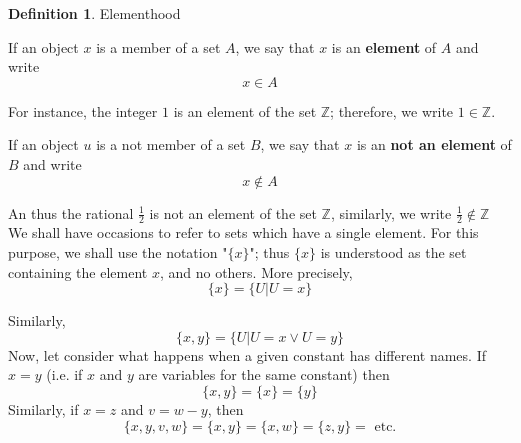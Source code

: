 \documentclass{book}
\theoremstyle{definition}
\newtheorem{definition}{Definition}[section]
\theoremstyle{remark}
\newcommand{\bb}[1]{\mathbb{#1}}
\begin{document}
\begin{definition}
Elementhood  \\

    \begin{tcolorbox}
        If an object $x$ is a member of a set $A$, we say that $x$ is an \textbf{element} of $A$ and write
            \begin{equation*}
                x \in A
            \end{equation*}
    \end{tcolorbox}
    
    For instance, the integer $1$ is an element of the set $\bb{Z}$; therefore, we write $1 \in \bb{Z}$. \\
    
    \begin{tcolorbox}
        If an object $u$ is a not member of a set $B$, we say that $x$ is an \textbf{not an element} of $B$ and write
            \begin{equation*}
                x \notin A
            \end{equation*}
    \end{tcolorbox}
    An thus the rational $\frac{1}{2}$ is not an element of the set $\bb{Z}$, similarly, we write $\frac{1}{2} \notin \bb{Z}$ \\
    
    We shall have occasions to refer to sets which have a single element. For this purpose, we shall use the notation "$\{ x \}$"; thus $\{ x \}$ is understood as the set containing the element $x$, and no others. More precisely, 
        \begin{equation*}
            \{ x \} = \{U | U = x \}    
        \end{equation*}
    
    Similarly, 
        \begin{equation*}
            \{ x,y \} = \{U | U = x \vee U = y \}             
        \end{equation*}
    Now, let consider what happens when a given constant has different names. If $x=y$ (i.e. if $x$ and $y$ are variables for the same constant) then
        \begin{equation*}
            \{ x,y \} = \{ x \} = \{y \}
        \end{equation*}
    Similarly, if $x=z$ and $v=w-y$, then
        \begin{equation*}
            \{x,y,v,w \} = \{x,y \} = \{x, w \} = \{z,y \} = \text{ etc.}
        \end{equation*}
\end{definition}
\end{document}
